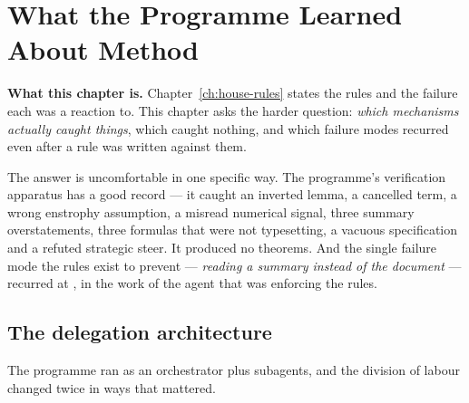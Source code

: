 \chapter{What the Programme Learned About Method}
\label{ch:methodology}

\begin{record}
\textbf{What this chapter is.} Chapter~\ref{ch:house-rules} states the rules
and the failure each was a reaction to. This chapter asks the harder question:
\emph{which mechanisms actually caught things}, which caught nothing, and
which failure modes recurred even after a rule was written against them.

\smallskip
The answer is uncomfortable in one specific way. The programme's verification
apparatus has a good record --- it caught an inverted lemma, a cancelled term,
a wrong enstrophy assumption, a misread numerical signal, three summary
overstatements, three formulas that were not typesetting, a vacuous
specification and a refuted strategic steer. It produced no theorems. And the
single failure mode the rules exist to prevent --- \emph{reading a summary
instead of the document} --- recurred at , in the work of the agent
that was enforcing the rules.
\end{record}

\section{The delegation architecture}
\label{sec:delegation}

The programme ran as an orchestrator plus subagents, and the division of
labour changed twice in ways that mattered.

